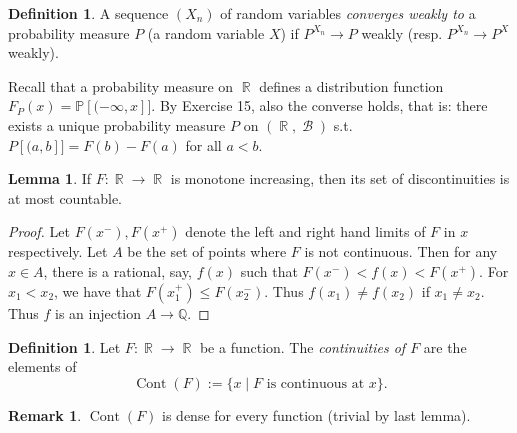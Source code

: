 \documentclass[12pt,a4paper]{report}
\theoremstyle{definition}
\newtheorem{lemma}[theorem]{Lemma}
\newtheorem{definition}[theorem]{Definition}
\newtheorem*{remark}{Remark}
\theoremstyle{num.custom-title}
\DeclareMathOperator{\B}{\mathcal{B}}
\DeclareMathOperator{\R}{\mathbb{R}}
\DeclareMathOperator{\Cont}{Cont}
\newcommand{\Q}{\mathbb{Q}}
\renewcommand{\1}{\mathbbm{1}}
\renewcommand{\P}{\mathbb{P}}
\begin{document}
\begin{definition}
A sequence $(X_n)$ of random variables \emph{converges weakly to} a probability measure $P$ (a random variable $X$) if $P^{X_n} \to P$ weakly (resp. $P^{X_n} \to P^X$ weakly).
\end{definition}

Recall that a probability measure on $\R$ defines a distribution function $F_P(x) = \P[(-\infty,x]]$. By Exercise 15, also the converse holds, that is: there exists a unique probability measure $P$ on $(\R,\B)$ s.t. $P[(a,b]] = F(b)-F(a)$ for all $a<b$.

\begin{lemma}
If $F: \R \to \R$ is monotone increasing, then its set of discontinuities is at most countable.
\begin{proof}
Let $F(x^-),F(x^+)$ denote the left and right hand limits of $F$ in $x$ respectively. Let $A$ be the set of points where $F$ is not continuous. Then for any $x \in A$, there is a rational, say, $f(x)$ such that $F(x^-) < f(x) < F(x^+)$. For $x_1 < x_2$, we have that $F(x_1^+) \leq F(x_2^-)$. Thus $f(x_1) \neq f(x_2)$ if $x_1 \neq x_2$. Thus $f$ is an injection $A \to \Q$.
\end{proof}
\end{lemma}

\begin{definition}
Let $F \colon \R \to \R$ be a function. The \emph{continuities of $F$} are the elements of
\[
\Cont(F) := \{x \mid F \text{ is continuous at } x\}.
\]
\end{definition}

\begin{remark}
$\Cont(F)$ is dense for every function (trivial by last lemma).
\end{remark}
\end{document}
